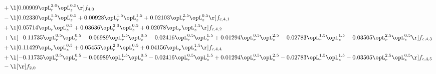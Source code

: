 \begin{alignat}{2}
& + \l[  0.00909 \opL_r^{2.0} \opL_z^{0.5}  \r] f_{4,0} \nonumber \\ 
& - \l[  0.02330 \opL_r^{1.5} \opL_z^{0.5} +  0.00928 \opL_r^{1.5} \opL_z^{1.5} +  0.02103 \opL_r^{2.5} \opL_z^{0.5}  \r] f_{c,4,1} \nonumber \\ 
& + \l[  0.05714 \opL_r \opL_z^{0.5} +  0.03636 \opL_r^{2.0} \opL_z^{0.5} +  0.02078 \opL_r \opL_z^{1.5}  \r] f_{c,4,2} \nonumber \\ 
& + \l[  -0.11735 \opL_r^{0.5} \opL_z^{0.5}   -0.06989 \opL_r^{1.5} \opL_z^{0.5}   -0.02416 \opL_r^{0.5} \opL_z^{1.5} +  0.01294 \opL_r^{0.5} \opL_z^{2.5}   -0.02783 \opL_r^{1.5} \opL_z^{1.5}   -0.03505 \opL_r^{2.5} \opL_z^{0.5}  \r] f_{c,4,3} \nonumber \\ 
& + \l[  0.11429 \opL_r \opL_z^{0.5} +  0.05455 \opL_r^{2.0} \opL_z^{0.5} +  0.04156 \opL_r \opL_z^{1.5}  \r] f_{c,4,4} \nonumber \\ 
& + \l[  -0.11735 \opL_r^{0.5} \opL_z^{0.5}   -0.06989 \opL_r^{1.5} \opL_z^{0.5}   -0.02416 \opL_r^{0.5} \opL_z^{1.5} +  0.01294 \opL_r^{0.5} \opL_z^{2.5}   -0.02783 \opL_r^{1.5} \opL_z^{1.5}   -0.03505 \opL_r^{2.5} \opL_z^{0.5}  \r] f_{c,4,5} \nonumber \\ 
& - \l[  \r] f_{2,0} \nonumber \\ 
\end{alignat} 


